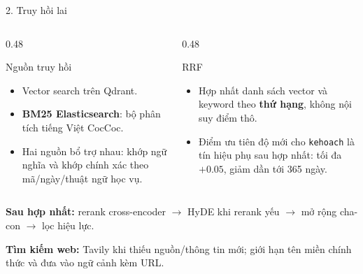 \documentclass[t, aspectratio=169]{beamer}
\begin{document}
				\begin{frame}{2. Truy hồi lai}
			\begin{columns}[T,onlytextwidth]
				\begin{column}{0.48\textwidth}
					\begin{block}{Nguồn truy hồi}
						\scriptsize
						\begin{itemize}
								\item Vector search trên Qdrant.
								\item \textbf{BM25 Elasticsearch}: bộ phân tích tiếng Việt CocCoc.
								\item Hai nguồn bổ trợ nhau: khớp ngữ nghĩa và khớp chính xác theo mã/ngày/thuật ngữ học vụ.
						\end{itemize}
					\end{block}
				\end{column}
				\begin{column}{0.48\textwidth}
					\begin{block}{RRF}
						\scriptsize
						\begin{itemize}
							\item Hợp nhất danh sách vector và keyword theo \textbf{thứ hạng}, không nội suy điểm thô.
							\item Điểm ưu tiên độ mới cho \texttt{kehoach} là tín hiệu phụ sau hợp nhất: tối đa $+0.05$, giảm dần tới 365 ngày.
						\end{itemize}
					\end{block}
				\end{column}
			\end{columns}

			\vspace{0.06cm}
				{\scriptsize\textbf{Sau hợp nhất:} rerank cross-encoder $\rightarrow$ HyDE khi rerank yếu $\rightarrow$ mở rộng cha-con $\rightarrow$ lọc hiệu lực.}

			\vspace{0.04cm}
			{\scriptsize\textbf{Tìm kiếm web:} Tavily khi thiếu nguồn/thông tin mới; giới hạn tên miền chính thức và đưa vào ngữ cảnh kèm URL.}
		\end{frame}
\end{document}
